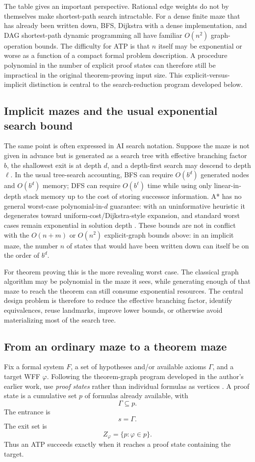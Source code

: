 The table gives an important perspective. Rational edge weights do not by themselves make shortest-path search intractable. For a dense finite maze that has already been written down, BFS, Dijkstra with a dense implementation, and DAG shortest-path dynamic programming all have familiar $O(n^2)$ graph-operation bounds. The difficulty for ATP is that $n$ itself may be exponential or worse as a function of a compact formal problem description. A procedure polynomial in the number of explicit proof states can therefore still be impractical in the original theorem-proving input size. This explicit-versus-implicit distinction is central to the search-reduction program developed below.

\subsection{Implicit mazes and the usual exponential search bound}
The same point is often expressed in AI search notation. Suppose the maze is not given in advance but is generated as a search tree with effective branching factor $b$, the shallowest exit is at depth $d$, and a depth-first search may descend to depth $\ell$. In the usual tree-search accounting, BFS can require $O(b^d)$ generated nodes and $O(b^d)$ memory; DFS can require $O(b^{\ell})$ time while using only linear-in-depth stack memory up to the cost of storing successor information. A* has no general worst-case polynomial-in-$d$ guarantee: with an uninformative heuristic it degenerates toward uniform-cost/Dijkstra-style expansion, and standard worst cases remain exponential in solution depth \cite{aima,astar}. These bounds are not in conflict with the $O(n+m)$ or $O(n^2)$ explicit-graph bounds above: in an implicit maze, the number $n$ of states that would have been written down can itself be on the order of $b^d$.

For theorem proving this is the more revealing worst case. The classical graph algorithm may be polynomial in the maze it sees, while generating enough of that maze to reach the theorem can still consume exponential resources. The central design problem is therefore to reduce the effective branching factor, identify equivalences, reuse landmarks, improve lower bounds, or otherwise avoid materializing most of the search tree.

\subsection{From an ordinary maze to a theorem maze}
Fix a formal system $F$, a set of hypotheses and/or available axioms $\Gamma$, and a target WFF $\varphi$. Following the theorem-graph program developed in the author's earlier work, use \emph{proof states} rather than individual formulas as vertices \cite{depths}. A proof state is a cumulative set $p$ of formulas already available, with
\[
\Gamma\subseteq p.
\]
The entrance is
\[
s=\Gamma.
\]
The exit set is
\[
Z_\varphi=\{p:\varphi\in p\}.
\]
Thus an ATP succeeds exactly when it reaches a proof state containing the target.

